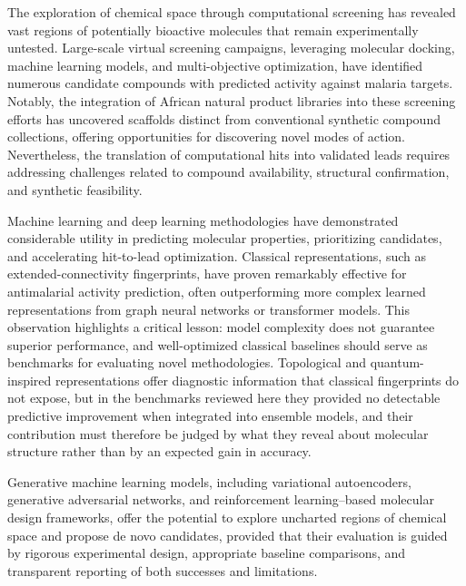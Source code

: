 The exploration of chemical space through computational screening has revealed vast regions of potentially bioactive molecules that remain experimentally untested. Large-scale virtual screening campaigns, leveraging molecular docking, machine learning models, and multi-objective optimization, have identified numerous candidate compounds with predicted activity against malaria targets. Notably, the integration of African natural product libraries into these screening efforts has uncovered scaffolds distinct from conventional synthetic compound collections, offering opportunities for discovering novel modes of action. Nevertheless, the translation of computational hits into validated leads requires addressing challenges related to compound availability, structural confirmation, and synthetic feasibility.

Machine learning and deep learning methodologies have demonstrated considerable utility in predicting molecular properties, prioritizing candidates, and accelerating hit-to-lead optimization. Classical representations, such as extended-connectivity fingerprints, have proven remarkably effective for antimalarial activity prediction, often outperforming more complex learned representations from graph neural networks or transformer models. This observation highlights a critical lesson: model complexity does not guarantee superior performance, and well-optimized classical baselines should serve as benchmarks for evaluating novel methodologies. Topological and quantum-inspired representations offer diagnostic information that classical fingerprints do not expose, but in the benchmarks reviewed here they provided no detectable predictive improvement when integrated into ensemble models, and their contribution must therefore be judged by what they reveal about molecular structure rather than by an expected gain in accuracy.

Generative machine learning models, including variational autoencoders, generative adversarial networks, and reinforcement learning–based molecular design frameworks, offer the potential to explore uncharted regions of chemical space and propose de novo candidates, provided that their evaluation is guided by rigorous experimental design, appropriate baseline comparisons, and transparent reporting of both successes and limitations.

